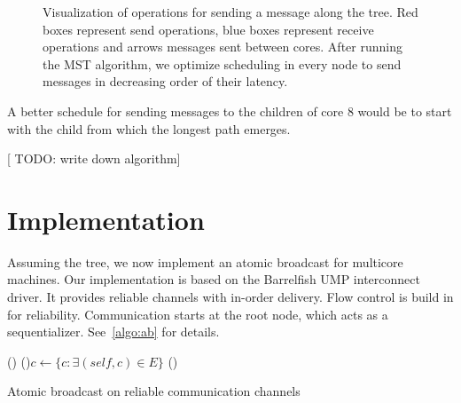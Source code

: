 \documentclass{article}
\newcommand{\stefan}[1]{
  {\color{skRed}[{\color{red}{SK}} #1]}}
\begin{document}
\begin{figure}[htb]
  \centering
  \begin{tikzpicture}[scale=.35,transform shape]
    
  \end{tikzpicture}
  \caption{Visualization of operations for sending a message along the
    tree. Red boxes represent send operations, blue boxes represent
    receive operations and arrows messages sent between cores. After
    running the MST algorithm, we optimize scheduling in every node to
    send messages in decreasing order of their latency.}
  \label{fig:mst_gruyere_operations_sorted}
\end{figure}

A better schedule for sending messages to the children of core 8 would
be to start with the child from which the longest path emerges.

\stefan{TODO: write down algorithm}

\section{Implementation}
\label{sec:implementation}

Assuming the tree, we now implement an atomic broadcast for multicore
machines. Our implementation is based on the Barrelfish UMP
interconnect driver. It provides reliable channels with in-order
delivery. Flow control is build in for reliability. Communication
starts at the root node, which acts as a
sequentializer. See~\ref{algo:ab} for details.

\begin{algorithm}[htb]
%
%
%
%
%
%
%
  \BlankLine
  \Fn(){}{
    \For(){$c \leftarrow \{ c: \exists (self, c) \in E \} $}{
    }
    \waitchild{}\;
    \;
  }
  \BlankLine
  \Fn(){}{
  }
  \caption{Atomic broadcast on reliable communication channels}
  \label{algo:ab}

\end{algorithm}
\end{document}
